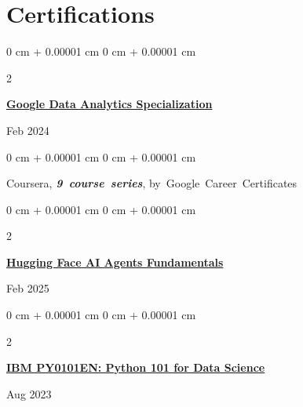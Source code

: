 \documentclass[10pt, letterpaper]{article}
\newenvironment{onecolentry}{
    \begin{adjustwidth}{
        0 cm + 0.00001 cm
    }{
        0 cm + 0.00001 cm
    }
}{
    \end{adjustwidth}
} %
\newenvironment{twocolentry}[2][]{
    \onecolentry
    \def\secondColumn{#2}
    \setcolumnwidth{\fill, 4.5 cm}
    \begin{paracol}{2}
}{
    \switchcolumn \raggedleft \secondColumn
    \end{paracol}
    \endonecolentry
} %
\begin{document}


        
    \section{Certifications}



        
        \begin{samepage}
            \begin{twocolentry}{
                Feb 2024
            }
                \textbf{\href{https://www.coursera.org/account/accomplishments/specialization/E72WSQMVB35K}{Google Data Analytics Specialization}}
            \end{twocolentry}

            \vspace{0.10 cm}
            
            \begin{onecolentry}
                \mbox{Coursera}, \mbox{\textbf{\textit{9 course series}}}, \mbox{by Google Career Certificates}

                \vspace{0.10 cm}
                
        
        \end{onecolentry}
        \end{samepage}
        
        \vspace{0.2 cm}
        
         \begin{samepage}
            \begin{twocolentry}{
                Feb 2025
            }
                \textbf{\href{https://huggingface.co/datasets/agents-course/certificates/resolve/main/certificates/SabbirAhmed404/2025-02-20.png}{Hugging Face AI Agents Fundamentals}}
            \end{twocolentry}

            \vspace{0.10 cm}
            
        \end{samepage}

               \vspace{0.2 cm}
        
         \begin{samepage}
            \begin{twocolentry}{
                Aug 2023
            }
                \textbf{\href{https://courses.cognitiveclass.ai/certificates/528cbee0ff0d45b3bd989ac9d6825980}{IBM PY0101EN: Python 101 for Data Science}}
            \end{twocolentry}
            
        \end{samepage}

    
    


   
\end{document}
